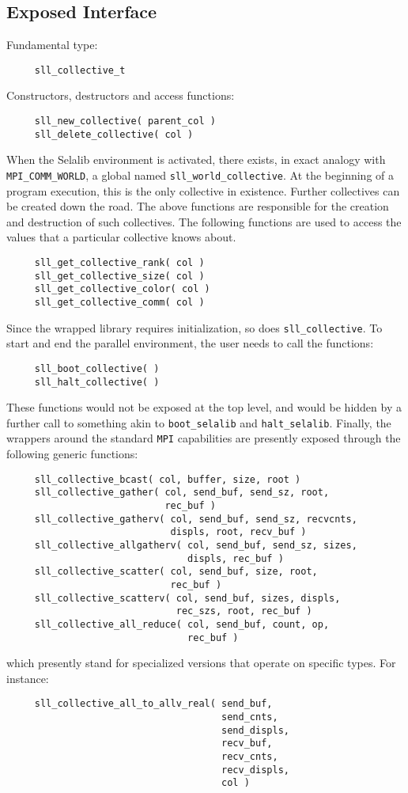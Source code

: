 \documentclass[]{report}   %
\begin{document}
\subsection{Exposed Interface}
Fundamental type:
\begin{verbatim}
     sll_collective_t
\end{verbatim}
Constructors, destructors and access functions:
\begin{verbatim}
     sll_new_collective( parent_col )
     sll_delete_collective( col )
\end{verbatim}	
When the Selalib environment is activated, there exists, in exact analogy with \verb+MPI_COMM_WORLD+, a global named \verb+sll_world_collective+. At the beginning of a program execution, this is the only collective in existence. Further collectives can be created down the road. The above functions are responsible for the creation and destruction of such collectives. The following functions are used to access the values that a particular collective knows about.
\begin{verbatim}
     sll_get_collective_rank( col )
     sll_get_collective_size( col )
     sll_get_collective_color( col )
     sll_get_collective_comm( col )
\end{verbatim}
Since the wrapped library requires initialization, so does \verb+sll_collective+. To start and end the parallel environment, the user needs to call the functions:
\begin{verbatim}
     sll_boot_collective( )
     sll_halt_collective( )
\end{verbatim}
These functions would not be exposed at the top level, and would be hidden by a further call to something akin to \verb+boot_selalib+ and \verb+halt_selalib+.
Finally, the wrappers around the standard \verb+MPI+ capabilities are presently exposed through the following generic functions:
\begin{verbatim}
     sll_collective_bcast( col, buffer, size, root )
     sll_collective_gather( col, send_buf, send_sz, root, 
                            rec_buf )
     sll_collective_gatherv( col, send_buf, send_sz, recvcnts, 
                             displs, root, recv_buf )
     sll_collective_allgatherv( col, send_buf, send_sz, sizes, 
                                displs, rec_buf )
     sll_collective_scatter( col, send_buf, size, root, 
                             rec_buf )
     sll_collective_scatterv( col, send_buf, sizes, displs, 
                              rec_szs, root, rec_buf )
     sll_collective_all_reduce( col, send_buf, count, op, 
                                rec_buf )
\end{verbatim}
which presently stand for specialized versions that operate on specific types. For instance:
\begin{verbatim}
     sll_collective_all_to_allv_real( send_buf, 
                                      send_cnts, 
                                      send_displs, 
                                      recv_buf, 
                                      recv_cnts, 
                                      recv_displs, 
                                      col )
\end{verbatim}
\end{document}
